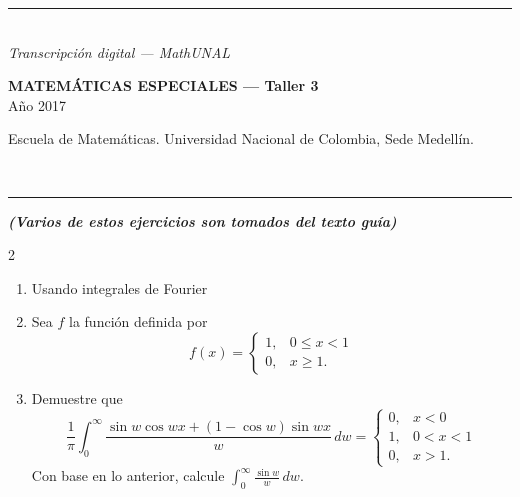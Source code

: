 \documentclass[11pt]{article}
\newcommand{\examheader}[2]{%
  \noindent
  \begin{minipage}[t]{0.6\linewidth}
    {\small\bfseries MATEM\'ATICAS ESPECIALES --- #1}\\
    {\small #2}
  \end{minipage}%
  \hfill
  \begin{minipage}[t]{0.35\linewidth}
    \raggedleft\small Escuela de Matem\'aticas. Universidad Nacional de Colombia, Sede Medell\'in.
  \end{minipage}\\[2pt]
  \rule{\linewidth}{0.6pt}
}
\newcommand{\examfooter}{%
  \vfill
  \rule{\linewidth}{0.4pt}\\[1pt]
  {\scriptsize\textit{Transcripci\'on digital --- MathUNAL}\hfill\textcolor{unalblue}{\textbf{\thepage}}}
}
\begin{document}
\examfooter
\newpage

\examheader{Taller 3}{A\~no 2017}

{\small\itshape\bfseries (Varios de estos ejercicios son tomados del texto guía)}

\columnseprule=0.5pt
\begin{multicols}{2}
\begin{enumerate}
\item Usando integrales de Fourier
\begin{opciones}
\item Demuestre que
\[
\int_0^\infty \frac{\sin(\omega)}{\omega}\cos(\omega x)\,d\omega = \begin{cases} \dfrac{\pi}{2}, & x \in [0,1) \\ \dfrac{\pi}{4}, & x=1 \\ 0, & x > 1. \end{cases}
\]
\item Calcule el valor de
\[
\int_0^\infty \frac{\sin(2\omega)}{\omega}\,d\omega.
\]
\end{opciones}

\item Sea $f$ la función definida por
\[
f(x) = \begin{cases} 1, & 0 \le x < 1 \\ 0, & x \ge 1. \end{cases}
\]
\end{enumerate}
\end{multicols}

\begin{enumerate}
\setcounter{enumi}{2}
\item Demuestre que
\[
\frac{1}{\pi}\int_0^\infty \frac{\sin w \cos wx + (1-\cos w)\sin wx}{w}\,dw =
\begin{cases}
0, & x<0 \\
1, & 0<x<1 \\
0, & x>1.
\end{cases}
\]
Con base en lo anterior, calcule $\displaystyle\int_0^\infty \frac{\sin w}{w}\,dw$.
\end{enumerate}
\end{document}
